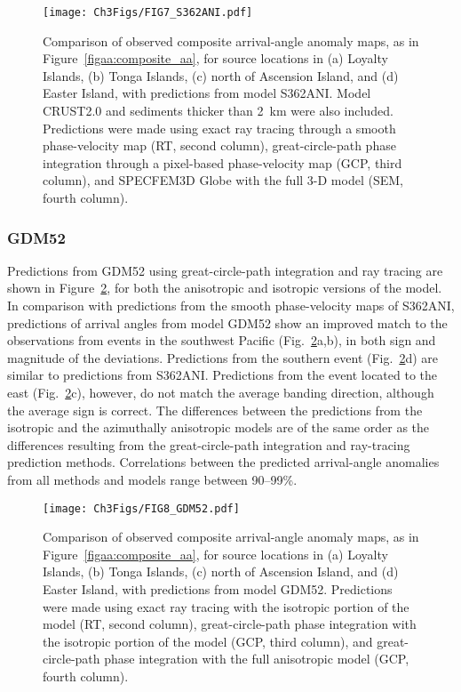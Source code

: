\documentclass[12pt,oneside]{book}
\begin{document}
\begin{figure} 
\begin{center}
\texttt{[image: Ch3Figs/FIG7\_S362ANI.pdf]} 
\caption[Predictions of arrival-angle anomalies from model S362ANI with CRUST2.0]{Comparison of observed composite arrival-angle anomaly maps, as in Figure~\ref{figaa:composite_aa}, for source locations in (a) Loyalty Islands, (b) Tonga Islands, (c) north of Ascension Island, and (d) Easter Island, with predictions from model S362ANI. Model CRUST2.0 and sediments thicker than 2~km were also included. Predictions were made using exact ray tracing through a smooth phase-velocity map (RT, second column), great-circle-path phase integration through a pixel-based phase-velocity map (GCP, third column), and SPECFEM3D Globe with the full 3-D model (SEM, fourth column). }
\label{figaa:S362ANIpredictions}
\end{center}
\end{figure}
%

\subsubsection*{GDM52}
Predictions from GDM52 using great-circle-path integration and ray tracing are shown in Figure~\ref{figaa:GDM52predictions}, for both the anisotropic and isotropic versions of the model. In comparison with predictions from the smooth phase-velocity maps of S362ANI, predictions of arrival angles from model GDM52 show an improved match to the observations from events in the southwest Pacific (Fig.~\ref{figaa:GDM52predictions}a,b), in both sign and magnitude of the deviations. Predictions from the southern event (Fig.~\ref{figaa:GDM52predictions}d) are similar to predictions from S362ANI. Predictions from the event located to the east (Fig.~\ref{figaa:GDM52predictions}c), however, do not match the average banding direction, although the average sign is correct. The differences between the predictions from the isotropic and the azimuthally anisotropic models are of the same order as the differences resulting from the great-circle-path integration and ray-tracing prediction methods. Correlations between the predicted arrival-angle anomalies from all methods and models range between 90--99\%. 

\begin{figure} 
\begin{center}
\texttt{[image: Ch3Figs/FIG8\_GDM52.pdf]} 
\caption[Predictions of arrival-angle anomalies from model GDM52]{Comparison of observed composite arrival-angle anomaly maps, as in Figure~\ref{figaa:composite_aa}, for source locations in (a) Loyalty Islands, (b) Tonga Islands, (c) north of Ascension Island, and (d) Easter Island, with predictions from model GDM52. Predictions were made using exact ray tracing with the isotropic portion of the model (RT, second column), great-circle-path phase integration with the isotropic portion of the model (GCP, third column), and great-circle-path phase integration with the full anisotropic model (GCP, fourth column). }
\label{figaa:GDM52predictions}
\end{center}
\end{figure}
%
\end{document}
